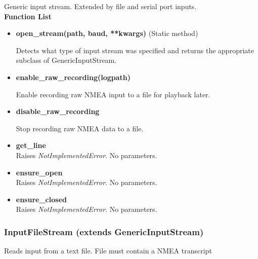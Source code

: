 Generic input stream. Extended by file and serial port inputs. \\

\textbf{Function List}
\begin{itemize}
	
	\item \textbf{open\_stream(path, baud, **kwargs)} (Static method)

	Detects what type of input stream was specified and returns
	the appropriate subclass of GenericInputStream. 


	\item \textbf{enable\_raw\_recording(logpath)}

	Enable recording raw NMEA input to a file for playback later.


	\item \textbf{disable\_raw\_recording}

	Stop recording raw NMEA data to a file.

	\item \textbf{get\_line} \\
	Raises \emph{NotImplementedError}. No parameters.

	\item \textbf{ensure\_open} \\
	Raises \emph{NotImplementedError}. No parameters.

	\item \textbf{ensure\_closed} \\
	Raises \emph{NotImplementedError}. No parameters.	

\end{itemize}

\subsubsection{InputFileStream (extends GenericInputStream)}

Reads input from a text file. File must contain a NMEA transcript \\

